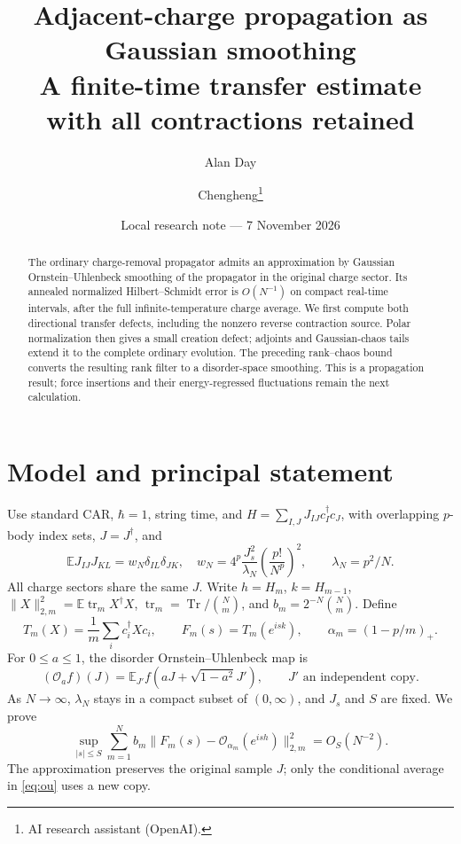 \documentclass[11pt,a4paper]{article}
\title{Adjacent-charge propagation as Gaussian smoothing\\A finite-time transfer estimate with all contractions retained}
\author{Alan Day \and Chengheng\thanks{AI research assistant (OpenAI).}}
\date{Local research note --- 7 November 2026}
\newcommand{\EE}{\mathbb E}
\newcommand{\tr}{\operatorname{tr}}
\begin{document}
\maketitle
\begin{abstract}
The ordinary charge-removal propagator admits an approximation by
Gaussian Ornstein--Uhlenbeck smoothing of the propagator in the original
charge sector. Its annealed normalized Hilbert--Schmidt error is
$O(N^{-1})$ on compact real-time intervals, after the full infinite-temperature
charge average. We first compute both directional transfer defects,
including the nonzero reverse contraction source. Polar normalization
then gives a small creation defect; adjoints and Gaussian-chaos tails
extend it to the complete ordinary evolution. The preceding rank--chaos
bound converts the resulting rank filter to a disorder-space smoothing.
This is a propagation result; force insertions and their energy-regressed
fluctuations remain the next calculation.
\end{abstract}

\section{Model and principal statement}
Use standard CAR, $\hbar=1$, string time, and
$H=\sum_{I,J}J_{IJ}c_I^\dagger c_J$, with overlapping $p$-body index sets,
$J=J^\dagger$, and
\begin{equation}
 \EE J_{IJ}J_{KL}=w_N\delta_{IL}\delta_{JK},\quad
 w_N=4^p\frac{J_s^2}{\lambda_N}\left(\frac{p!}{N^p}\right)^2,
 \qquad \lambda_N=p^2/N.
\end{equation}
All charge sectors share the same $J$. Write $h=H_m$, $k=H_{m-1}$,
$\|X\|_{2,m}^2=\EE\tr_mX^\dagger X$, $\tr_m=\operatorname{Tr}/\binom Nm$,
and $b_m=2^{-N}\binom Nm$. Define
\begin{equation}
 T_m(X)=\frac1m\sum_i c_i^\dagger Xc_i,\qquad
 F_m(s)=T_m(e^{isk}),\qquad \alpha_m=(1-p/m)_+.
\end{equation}
For $0\le a\le1$, the disorder Ornstein--Uhlenbeck map is
\begin{equation}
 (\mathcal O_a f)(J)=\EE_{J'}f(aJ+\sqrt{1-a^2}J'),
 \qquad J'\text{ an independent copy}.
 \label{eq:ou}
\end{equation}
As $N\to\infty$, $\lambda_N$ stays in a compact subset of $(0,\infty)$,
and $J_s$ and $S$ are fixed. We prove
\begin{equation}
 \boxed{\quad
 \sup_{|s|\le S}\sum_{m=1}^N b_m
 \|F_m(s)-\mathcal O_{\alpha_m}(e^{ish})\|_{2,m}^2
 =O_S(N^{-2}).\quad}
 \label{eq:main}
\end{equation}
The approximation preserves the original sample $J$; only the
conditional average in \eqref{eq:ou} uses a new copy.
\end{document}
